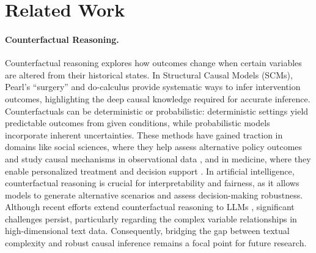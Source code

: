 \section{Related Work}
\paragraph{Counterfactual Reasoning.}
Counterfactual reasoning explores how outcomes change when certain variables are altered from their historical states. In Structural Causal Models (SCMs), Pearl’s \cite{pearl2009causality} “surgery” and do-calculus provide systematic ways to infer intervention outcomes, highlighting the deep causal knowledge required for accurate inference. Counterfactuals can be deterministic or probabilistic: deterministic settings yield predictable outcomes from given conditions, while probabilistic models incorporate inherent uncertainties. These methods have gained traction in domains like social sciences, where they help assess alternative policy outcomes and study causal mechanisms in observational data \cite{morgan2015counterfactuals}, and in medicine, where they enable personalized treatment and decision support \cite{johansson2016learning,shalit2017estimating,louizos2017causal,yoon2018ganite}. In artificial intelligence, counterfactual reasoning is crucial for interpretability and fairness, as it allows models to generate alternative scenarios and assess decision-making robustness. Although recent efforts extend counterfactual reasoning to LLMs \cite{jin2023cladder}, significant challenges persist, particularly regarding the complex variable relationships in high-dimensional text data. Consequently, bridging the gap between textual complexity and robust causal inference remains a focal point for future research.

